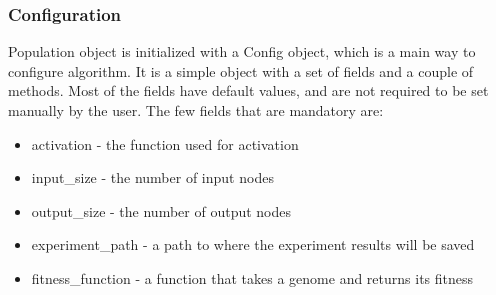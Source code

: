 \documentclass{article}
\begin{document}
        \subsubsection{Configuration}
        Population object is initialized with a Config object, which is a main way to configure algorithm. It is a simple object with a set of fields
        and a couple of methods. Most of the fields have default values, and are not required to be set manually by the user. The few fields that are
        mandatory are: 
        \begin{itemize}
            \item activation - the function used for activation
            \item input\_size - the number of input nodes
            \item output\_size - the number of output nodes
            \item experiment\_path - a path to where the experiment results will be saved
            \item fitness\_function - a function that takes a genome and returns its fitness
        \end{itemize}
\end{document}
